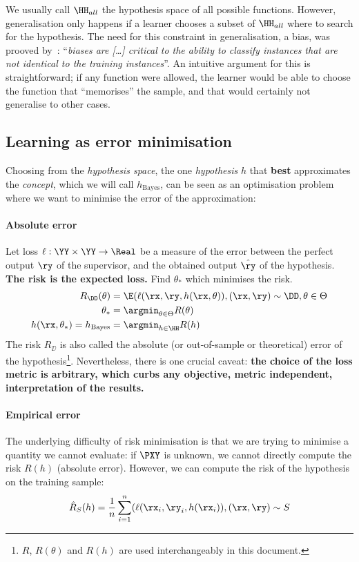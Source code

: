 We usually call \(\HH_{all}\) the hypothesis space of all possible functions. However, generalisation only happens if a learner chooses a subset of \(\HH_{all}\) where to search for the hypothesis. The need for this constraint in generalisation, a bias, was prooved by~\citeauthor{mitchell:1980}: ``\emph{biases are [\dots] critical to the ability to classify instances that are not identical to the training instances}''. An intuitive argument for this is straightforward; if any function were allowed, the learner would be able to choose the function that ``memorises'' the sample, and that would certainly not generalise to other cases.

\subsection{Learning as error minimisation} Choosing from the \emph{hypothesis space}, the one \emph{hypothesis} \(h\) that \textbf{best} approximates the \emph{concept}, which we will call \(h_{\text{Bayes}}\), can be seen as an optimisation problem where we want to minimise the error of the approximation:
\paragraph{Absolute error} Let loss \(\ell:\YY \times \YY \to \Real \) be a measure of the error between the perfect output \(\ry\) of the supervisor, and the obtained output \(\hat{\ry}\) of the hypothesis. \textbf{The risk is the expected loss.} Find \(\theta_*\) which minimises the risk.
\begin{align}
	R_{\DD}(\theta) &= \E(\ell(\rx, \ry, h(\rx, \theta)), (\rx, \ry)\sim \DD, \theta \in \Theta\\
	\theta_{*}&= \argmin_{\theta \in \Theta} R(\theta)\\
	h(\rx,\theta_*) = h_{\text{Bayes}} &= \argmin_{h \in \HH} R(h)
\end{align}
The risk \(R_{\DD}\) is also called the absolute (or out-of-sample or theoretical) error of the hypothesis\footnote{\(R\), \(R(\theta)\) and \(R(h)\) are used interchangeably in this document.}. Nevertheless, there is one crucial caveat: \textbf{the choice of the loss metric is arbitrary, which curbs any objective, metric independent, interpretation of the results.}
\paragraph{Empirical error} The underlying difficulty of risk minimisation is that we are trying to minimise a quantity we cannot evaluate: if \(\PXY\) is unknown, we cannot directly compute the risk \(R(h)\) (absolute error). However, we can compute the risk of the hypothesis on the training sample:
\begin{align}
	\hat{R}_{S}(h) = \frac{1}{n} \sum_{i=1}^{n}(\ell(\rx_i, \ry_i, h(\rx_i)), (\rx,\ry)\sim S
\end{align}

